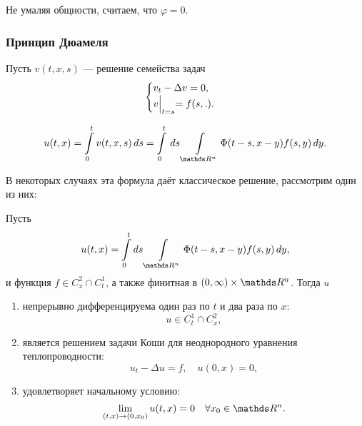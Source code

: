 Не умаляя общности, считаем, что $\varphi = 0$.

\subsubsection*{Принцип Дюамеля}

Пусть $v(t,x,s)$ --- решение семейства задач
\begin{equation*}
    \begin{cases} 
        v_t - \Delta v = 0, \\
        v\Bigl|_{t=s} = f(s, .).
    \end{cases}
\end{equation*}

$$u(t,x) = \int\limits_0^tv(t,x,s) \, ds = \int\limits_0^t \, ds \int\limits_{\real^n}\Phi(t-s, x-y)f(s,y) \, dy.$$

В некоторых случаях эта формула даёт классическое решение, рассмотрим один из них:

\begin{theorem}
Пусть $$u(t,x) = \int\limits_0^t ds \int \limits_{\real^n} \Phi (t-s, x-y) f(s,y) \, dy ,$$ и функция $f\in C_x^2 \cap C_t^1$, а также финитная в $(0, \infty) \times \real^n$. Тогда $u$
\begin{enumerate}
\item непрерывно дифференцируема один раз по $t$ и два раза по $x$: $$u \in C_t^1 \cap C_x^2,$$
\item является решением задачи Коши для неоднородного уравнения теплопроводности: $$u_t - \Delta u = f, \quad u(0,x) = 0,$$
\item удовлетворяет начальному условию: $$\lim_{(t,x) \to (0,x_0)} u(t,x) = 0 \quad  \forall x_0 \in \real^n.$$
\end{enumerate}
\end{theorem}


